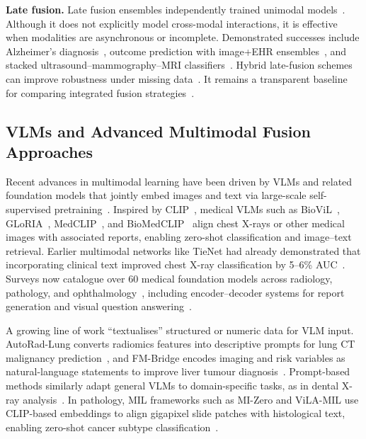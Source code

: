 \textbf{Late fusion.} Late fusion ensembles independently trained unimodal models~\cite{mohsen2022artificial}. Although it does not explicitly model cross-modal interactions, it is effective when modalities are asynchronous or incomplete. Demonstrated successes include Alzheimer’s diagnosis~\cite{qiu2018fusion}, outcome prediction with image+EHR ensembles~\cite{huang2020multimodal}, and stacked ultrasound–mammography–MRI classifiers~\cite{lu2024deep}. Hybrid late-fusion schemes can improve robustness under missing data~\cite{xiao2025novel}. It remains a transparent baseline for comparing integrated fusion strategies~\cite{mohsen2022artificial,huang2020multimodal}.

\subsection{VLMs and Advanced Multimodal Fusion Approaches} \label{sec:VLM}

Recent advances in multimodal learning have been driven by VLMs and related foundation models that jointly embed images and text via large-scale self-supervised pretraining~\cite{ryu2025vlmreview}. Inspired by CLIP~\cite{radford2021learning}, medical VLMs such as BioViL~\cite{boecking2022biovil,lyu2024language}, GLoRIA~\cite{huang2021gloria}, MedCLIP~\cite{park2020contrastive,wang2022medclip}, and BioMedCLIP~\cite{zhang2023biomedclip} align chest X-rays or other medical images with associated reports, enabling zero-shot classification and image–text retrieval. Earlier multimodal networks like TieNet had already demonstrated that incorporating clinical text improved chest X-ray classification by 5–6\% AUC~\cite{wang2018tienet}. Surveys now catalogue over 60 medical foundation models across radiology, pathology, and ophthalmology~\cite{ryu2025vlmreview}, including encoder–decoder systems for report generation and visual question answering~\cite{hartsock2024vlmreport,thawkar2023xraygpt}.

A growing line of work “textualises” structured or numeric data for VLM input. AutoRad-Lung converts radiomics features into descriptive prompts for lung CT malignancy prediction~\cite{khademi2025autorad}, and FM-Bridge encodes imaging and risk variables as natural-language statements to improve liver tumour diagnosis~\cite{huang2025fmbridge}. Prompt-based methods similarly adapt general VLMs to domain-specific tasks, as in dental X-ray analysis~\cite{du2024prompting}. In pathology, MIL frameworks such as MI-Zero and ViLA-MIL use CLIP-based embeddings to align gigapixel slide patches with histological text, enabling zero-shot cancer subtype classification~\cite{lu2023mizero,shi2024vila}.

